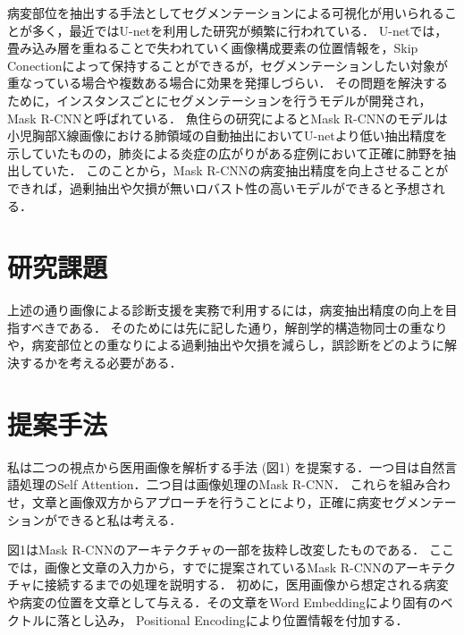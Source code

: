 \documentclass[a4j,10pt,twocolumn]{jarticle}
\begin{document}
病変部位を抽出する手法としてセグメンテーションによる可視化が用いられることが多く，最近ではU-netを利用した研究が頻繁に行われている\cite{近藤堅司2018u}．
U-netでは，畳み込み層を重ねることで失われていく画像構成要素の位置情報を，Skip Conectionによって保持することができるが，セグメンテーションしたい対象が重なっている場合や複数ある場合に効果を発揮しづらい．
その問題を解決するために，インスタンスごとにセグメンテーションを行うモデルが開発され，Mask R-CNNと呼ばれている\cite{he2017mask}．
魚住らの研究によるとMask R-CNNのモデルは小児胸部X線画像における肺領域の自動抽出においてU-netより低い抽出精度を示していたものの，肺炎による炎症の広がりがある症例において正確に肺野を抽出していた\cite{魚住春日2020mask}．
このことから，Mask R-CNNの病変抽出精度を向上させることができれば，過剰抽出や欠損が無いロバスト性の高いモデルができると予想される．

\section{研究課題}
上述の通り画像による診断支援を実務で利用するには，病変抽出精度の向上を目指すべきである．
そのためには先に記した通り，解剖学的構造物同士の重なりや，病変部位との重なりによる過剰抽出や欠損を減らし，誤診断をどのように解決するかを考える必要がある．

\section{提案手法}
私は二つの視点から医用画像を解析する手法 (図1) を提案する．一つ目は自然言語処理のSelf Attention\cite{vaswani2017attention}．二つ目は画像処理のMask R-CNN．
これらを組み合わせ，文章と画像双方からアプローチを行うことにより，正確に病変セグメンテーションができると私は考える．

図1はMask R-CNNのアーキテクチャの一部を抜粋し改変したものである．
ここでは，画像と文章の入力から，すでに提案されているMask R-CNNのアーキテクチャに接続するまでの処理を説明する．
初めに，医用画像から想定される病変や病変の位置を文章として与える．その文章をWord Embedding\cite{堅山耀太郎2017word}により固有のベクトルに落とし込み， Positional Encodingにより位置情報を付加する．
\end{document}
